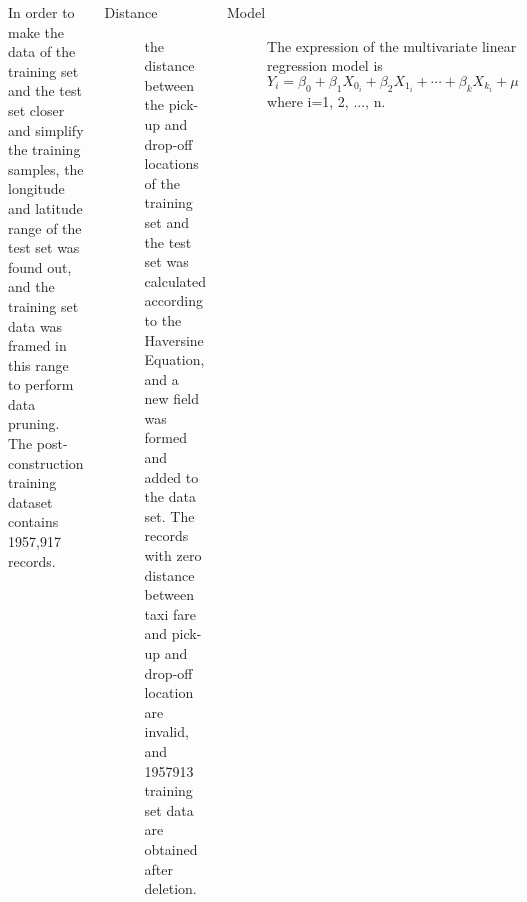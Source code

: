 \documentclass{tikzposter} %
\begin{document}
\begin{columns}
{\begin{description}
    In order to make the data of the training set and the test set closer and simplify the training samples, the longitude and latitude range of the test set was found out, and the training set data was framed in this range to perform data pruning. 
    The post-construction training dataset contains 1957,917 records. 
\end{description}


\begin{description}
  	\item[Distance]
    the distance between the pick-up and drop-off locations of the training set and the test set was calculated according to the Haversine Equation, and a new field was formed and added to the data set. The records with zero distance between taxi fare and pick-up and drop-off location are invalid, and 1957913 training set data are obtained after deletion.
\end{description}
}


{
\begin{description}
  	\item[Model] The expression of the multivariate linear regression model is$$
    {Y_i} ={\beta_0}+{\beta_1}{X_{0_i}}+{\beta_2}{X_{1_i}}+\cdots+{\beta_k}{X_{k_i}}+{\mu}
    $$where i=1, 2, ..., n.


\end{description}}
\end{columns}
\end{document}
